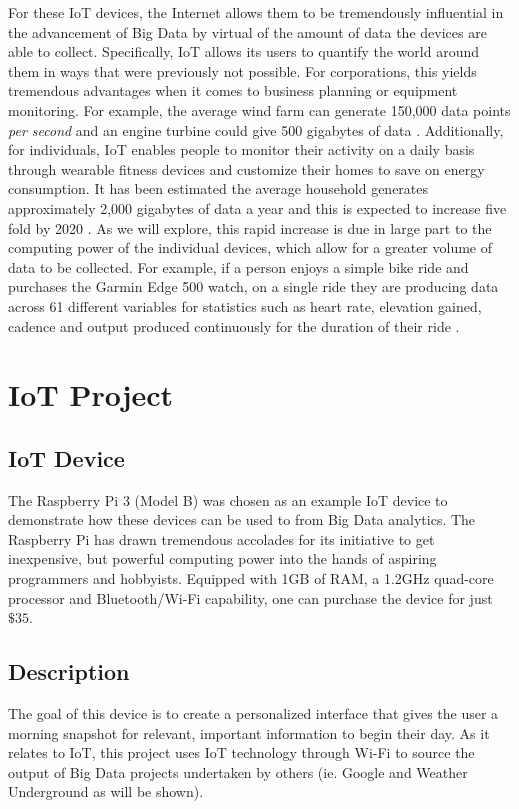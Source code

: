 \documentclass[sigconf]{acmart}
\begin{document}
For these IoT devices, the Internet allows them to be tremendously influential in the advancement of Big Data by virtual of the amount of data the devices are able to collect. Specifically, IoT allows its users to quantify the world around them in ways that were previously not possible. For corporations, this yields tremendous advantages when it comes to business planning or equipment monitoring. For example, the average wind farm can generate 150,000 data points \emph{per second} and an engine turbine could give 500 gigabytes of data \cite{wind}. Additionally, for individuals, IoT enables people to monitor their activity on a daily basis through wearable fitness devices and customize their homes to save on energy consumption. It has been estimated the average household generates approximately 2,000 gigabytes of data a year and this is expected to increase five fold by 2020 \cite{iotdata}. As we will explore, this rapid increase is due in large part to the computing power of the individual devices, which allow for a greater volume of data to be collected. For example, if a person enjoys a simple bike ride and purchases the Garmin Edge 500 watch, on a single ride they are producing data across 61 different variables for statistics such as heart rate, elevation gained, cadence and output produced continuously for the duration of their ride \cite{garmin}.

\section{IoT Project}
\subsection{IoT Device}
The Raspberry Pi 3 (Model B) was chosen as an example IoT device to demonstrate how these devices can be used to from Big Data analytics. The Raspberry Pi has drawn tremendous accolades for its initiative to get inexpensive, but powerful computing power into the hands of aspiring programmers and hobbyists. Equipped with 1GB of RAM, a 1.2GHz quad-core processor and Bluetooth/Wi-Fi capability, one can purchase the device for just $\$35$. 
\subsection{Description}
The goal of this device is to create a personalized interface that gives the user a morning snapshot for relevant, important information to begin their day. As it relates to IoT, this project uses IoT technology through Wi-Fi to source the output of Big Data projects undertaken by others (ie. Google and Weather Underground as will be shown).
\end{document}
